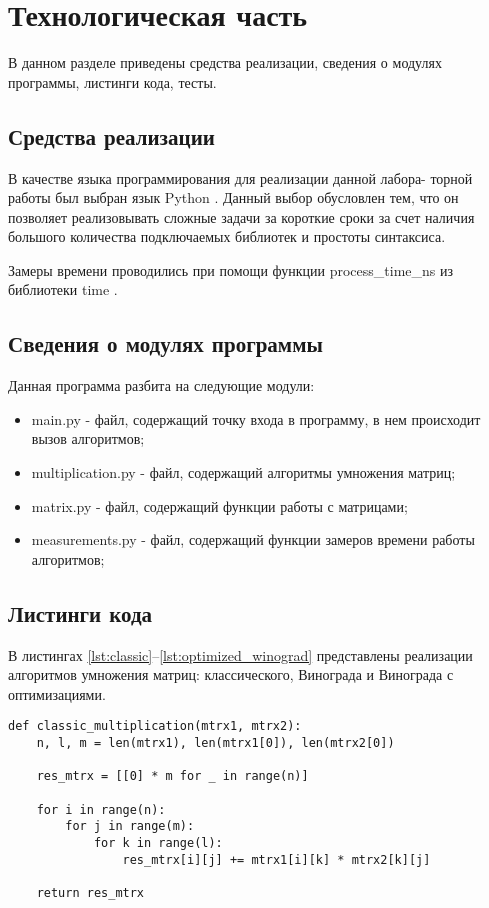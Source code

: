 \chapter{Технологическая часть}

В данном разделе приведены средства реализации, сведения о модулях программы, листинги кода, тесты.

\section{Средства реализации}

В качестве языка программирования для реализации данной лабора-
торной работы был выбран язык Python \cite{python}. Данный выбор обусловлен тем, что он позволяет реализовывать сложные задачи за короткие сроки за счет наличия большого количества подключаемых библиотек и простоты синтаксиса.

Замеры времени проводились при помощи функции process\_time\_ns из библиотеки time \cite{python-time}.

\section{Сведения о модулях программы}

Данная программа разбита на следующие модули:

\begin{itemize}
	\item main.py - файл, содержащий точку входа в программу, в нем происходит вызов алгоритмов;
	\item multiplication.py - файл, содержащий алгоритмы умножения матриц;
	\item matrix.py - файл, содержащий функции работы с матрицами;
	\item measurements.py - файл, содержащий функции замеров времени работы алгоритмов;
\end{itemize}

\section{Листинги кода}

В листингах \ref{lst:classic}--\ref{lst:optimized_winograd} представлены реализации алгоритмов умножения матриц: классического, Винограда и Винограда с оптимизациями.
\clearpage
\begin{center}
\captionsetup{justification=raggedright,singlelinecheck=off}
\begin{lstlisting}[label=lst:classic,caption=Классический алгоритм умножения матриц]
def classic_multiplication(mtrx1, mtrx2):
	n, l, m = len(mtrx1), len(mtrx1[0]), len(mtrx2[0])
	
	res_mtrx = [[0] * m for _ in range(n)]
	
	for i in range(n):
		for j in range(m):
			for k in range(l):
				res_mtrx[i][j] += mtrx1[i][k] * mtrx2[k][j]
	
	return res_mtrx

\end{lstlisting} 
\end{center}

